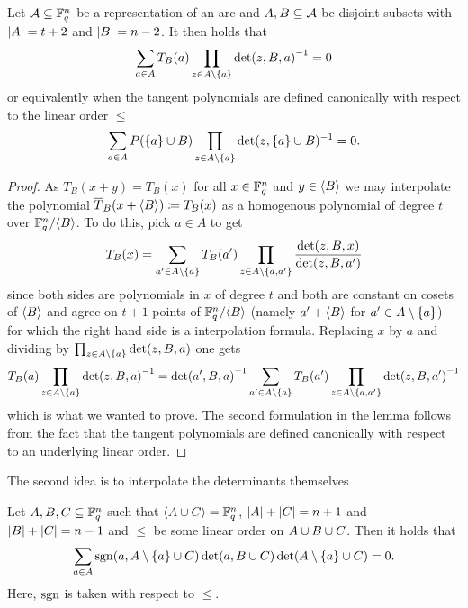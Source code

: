\begin{lemma}
    Let $\mathcal{A}\subseteq\mathbb{F}_{q}^n$ be a representation of an arc and $A,B\subseteq \mathcal{A}$ be disjoint subsets with
    $\left\vert{A}\right\vert=t+2$ and $\left\vert{B}\right\vert=n-2$. It then holds that
    $$
    \sum_{a\in A}{T_{B}(a)\prod_{z\in A\setminus \set a}{\det(z,B,a)}^{-1}} =0
    $$
    or equivalently when the tangent polynomials are defined canonically
    with respect to the linear order $\leq$
    $$
    \sum_{a\in A}{P(\set a\setjoin B)\prod_{z\in A\setminus\set a}\det(z,\set a\setjoin B)^{-1}}=0.
    $$
\end{lemma}
%
\begin{proof}
    As $T_B(x+y)=T_B(x)$ for all $x\in\mathbb{F}_{q}^n$ and $y\in\gen B$ we may
    interpolate the polynomial $\bar{T}_B(x+\gen B)\defeq T_{B}(x)$ as a homogenous polynomial of
    degree $t$ over $\field{q}^n/\gen B$. To do this, pick $a\in A$ to get
    $$
    T_B(x)=\sum_{a'\in A\setminus\set a}{T_B(a')\prod_{z\in A\setminus\set{a,a'}}{\frac{\det(z,B,x)}{\det(z,B,a')}}}
    $$
    since both sides are polynomials in $x$ of degree $t$
    and both are constant on cosets of $\gen B$ and agree on $t+1$
    points of $\field{q}^n/\gen B$ (namely $a'+\gen B$
    for $a'\in A\setminus\set a$) for which the right hand side is a  interpolation formula. Replacing $x$ by $a$ and dividing by
  $\prod_{z\in A\setminus\set a}{\det(z,B,a)}$ one gets 
  $$
  T_B(a)\prod_{z\in  A\setminus\set a}{{\det(z,B,a)}^{-1}} = {\det(a',B,a)}^{-1}\sum_{a'\in A\setminus\set a}{T_B(a')\prod_{z\in A\setminus\set{a,a'}}{{\det(z,B,a')}^{-1}}}
  $$
  which is what we wanted to prove.
  The second formulation in the lemma follows from the fact that the tangent polynomials are defined canonically with respect to an underlying linear order. 
\end{proof}

The second idea is to interpolate the determinants themselves
\begin{lemma}\label{mds-tan-poly-interpol-det}
    Let $A,B,C\subseteq \mathbb{F}_{q}^n$ such that $\gen{A\setjoin
    C}=\field{q}^n$, $\left\vert{A}\right\vert+\left\vert{C}\right\vert=n+1$ and $\left\vert{B}\right\vert+\left\vert{C}\right\vert=n-1$ and $\leq$
    be some linear order on $A\cup B\cup C$. Then it holds that
    $$
    \sum_{a\in A}{\sgn(a,A\setminus\set a\setjoin C)\det(a,B\setjoin C)\det(A\setminus\set a\setjoin C)}=0\text{.}
    $$
    Here, $\mathop\mathrm{sgn}$ is taken with respect to $\leq$.
\end{lemma}

